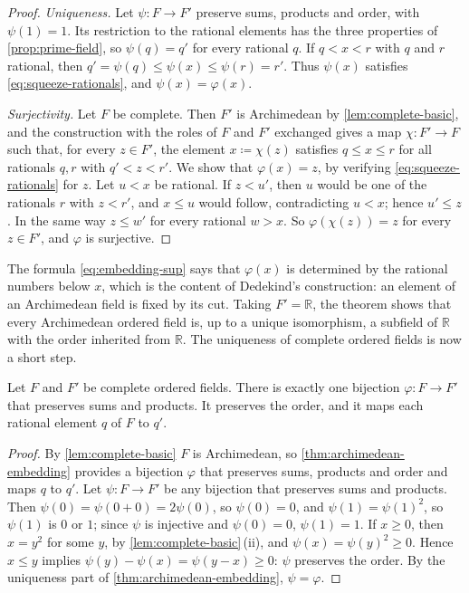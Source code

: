 \begin{proof}
\emph{Uniqueness.} Let $\psi\colon F\to F'$ preserve sums, products and order, with $\psi(1)=1$. Its restriction to the rational elements has the three properties of \cref{prop:prime-field}, so $\psi(q)=q'$ for every rational $q$. If $q<x<r$ with $q$ and $r$ rational, then $q'=\psi(q)\le\psi(x)\le\psi(r)=r'$. Thus $\psi(x)$ satisfies \eqref{eq:squeeze-rationals}, and $\psi(x)=\varphi(x)$.

\emph{Surjectivity.} Let $F$ be complete. Then $F'$ is Archimedean by \cref{lem:complete-basic}, and the construction with the roles of $F$ and $F'$ exchanged gives a map $\chi\colon F'\to F$ such that, for every $z\in F'$, the element $x\coloneqq\chi(z)$ satisfies $q\le x\le r$ for all rationals $q,r$ with $q'<z<r'$. We show that $\varphi(x)=z$, by verifying \eqref{eq:squeeze-rationals} for $z$. Let $u<x$ be rational. If $z<u'$, then $u$ would be one of the rationals $r$ with $z<r'$, and $x\le u$ would follow, contradicting $u<x$; hence $u'\le z$. In the same way $z\le w'$ for every rational $w>x$. So $\varphi(\chi(z))=z$ for every $z\in F'$, and $\varphi$ is surjective.
\end{proof}

The formula \eqref{eq:embedding-sup} says that $\varphi(x)$ is determined by the rational numbers below $x$, which is the content of Dedekind's construction: an element of an Archimedean field is fixed by its cut. Taking $F'=\mathbb R$, the theorem shows that every Archimedean ordered field is, up to a unique isomorphism, a subfield of $\mathbb R$ with the order inherited from $\mathbb R$. The uniqueness of complete ordered fields is now a short step.

\begin{theorem}
\label{thm:uniqueness-complete}
Let $F$ and $F'$ be complete ordered fields. There is exactly one bijection $\varphi\colon F\to F'$ that preserves sums and products. It preserves the order, and it maps each rational element $q$ of $F$ to $q'$.
\end{theorem}

\begin{proof}
By \cref{lem:complete-basic} $F$ is Archimedean, so \cref{thm:archimedean-embedding} provides a bijection $\varphi$ that preserves sums, products and order and maps $q$ to $q'$. Let $\psi\colon F\to F'$ be any bijection that preserves sums and products. Then $\psi(0)=\psi(0+0)=2\psi(0)$, so $\psi(0)=0$, and $\psi(1)=\psi(1)^2$, so $\psi(1)$ is $0$ or $1$; since $\psi$ is injective and $\psi(0)=0$, $\psi(1)=1$. If $x\ge0$, then $x=y^2$ for some $y$, by \cref{lem:complete-basic}\,(ii), and $\psi(x)=\psi(y)^2\ge0$. Hence $x\le y$ implies $\psi(y)-\psi(x)=\psi(y-x)\ge0$: $\psi$ preserves the order. By the uniqueness part of \cref{thm:archimedean-embedding}, $\psi=\varphi$.
\end{proof}

